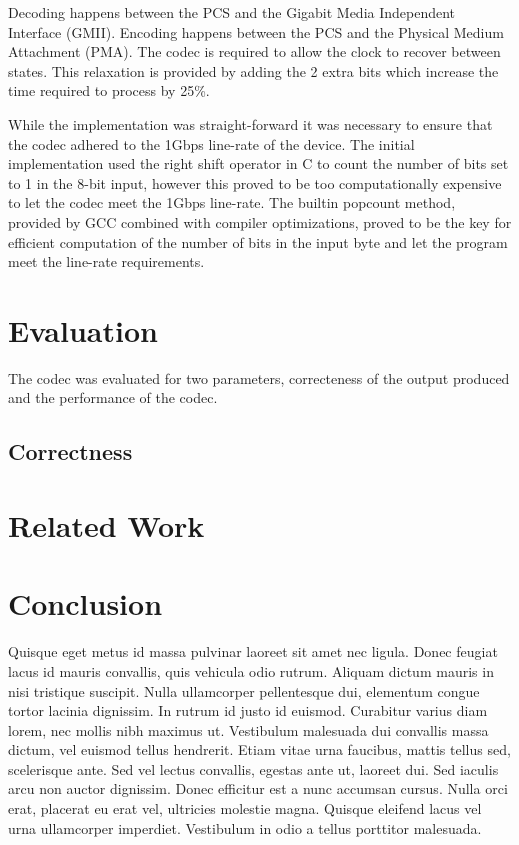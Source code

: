 \documentclass[conference]{IEEEtran}
\begin{document}
Decoding happens between the PCS and the Gigabit Media Independent Interface (GMII). Encoding happens between the PCS and the Physical Medium  Attachment (PMA). The codec is required to allow the clock to recover between states. This relaxation is provided by adding the 2 extra bits which increase the time required to process by 25\%.

While the implementation was straight-forward it was necessary to ensure that the codec adhered to the 1Gbps line-rate of the device. The initial implementation used the right shift operator in C to count the number of bits set to 1 in the 8-bit input, however this proved to be too computationally expensive to let the codec meet the 1Gbps line-rate. The builtin popcount method, provided by GCC combined with compiler optimizations, proved to be the key for efficient computation of the number of bits in the input byte and let the program meet the line-rate requirements.

\section{Evaluation}

The codec was evaluated for two parameters, correcteness of the output produced and the performance of the codec.

\subsection{Correctness}

\section{Related Work}

\section{Conclusion}

Quisque eget metus id massa pulvinar laoreet sit amet nec ligula. Donec feugiat lacus id mauris convallis, quis vehicula odio rutrum. Aliquam dictum mauris in nisi tristique suscipit. Nulla ullamcorper pellentesque dui, elementum congue tortor lacinia dignissim. In rutrum id justo id euismod. Curabitur varius diam lorem, nec mollis nibh maximus ut. Vestibulum malesuada dui convallis massa dictum, vel euismod tellus hendrerit. Etiam vitae urna faucibus, mattis tellus sed, scelerisque ante. Sed vel lectus convallis, egestas ante ut, laoreet dui. Sed iaculis arcu non auctor dignissim. Donec efficitur est a nunc accumsan cursus. Nulla orci erat, placerat eu erat vel, ultricies molestie magna. Quisque eleifend lacus vel urna ullamcorper imperdiet. Vestibulum in odio a tellus porttitor malesuada.



\end{document}

